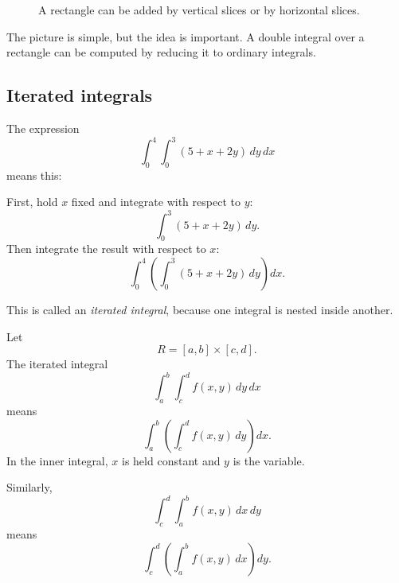 \begin{figure}[h]
\centering
{}
\caption{A rectangle can be added by vertical slices or by horizontal slices.}
\end{figure}

The picture is simple, but the idea is important.  A double integral over a rectangle can
be computed by reducing it to ordinary integrals.

\subsection{Iterated integrals}

The expression
\[
    \int_0^4\int_0^3 (5+x+2y)\,dy\,dx
\]
means this:

First, hold \(x\) fixed and integrate with respect to \(y\):
\[
    \int_0^3 (5+x+2y)\,dy.
\]
Then integrate the result with respect to \(x\):
\[
    \int_0^4 \left(\int_0^3 (5+x+2y)\,dy\right) dx.
\]

This is called an \emph{iterated integral}, because one integral is nested inside another.

\begin{definition}
Let
\[
    R=[a,b]\times[c,d].
\]
The iterated integral
\[
\boxed{
    \int_a^b\int_c^d f(x,y)\,dy\,dx
}
\]
means
\[
\boxed{
    \int_a^b
    \left(
        \int_c^d f(x,y)\,dy
    \right)
    dx.
}
\]
In the inner integral, \(x\) is held constant and \(y\) is the variable.

Similarly,
\[
\boxed{
    \int_c^d\int_a^b f(x,y)\,dx\,dy
}
\]
means
\[
\boxed{
    \int_c^d
    \left(
        \int_a^b f(x,y)\,dx
    \right)
    dy.
}
\]
\end{definition}

